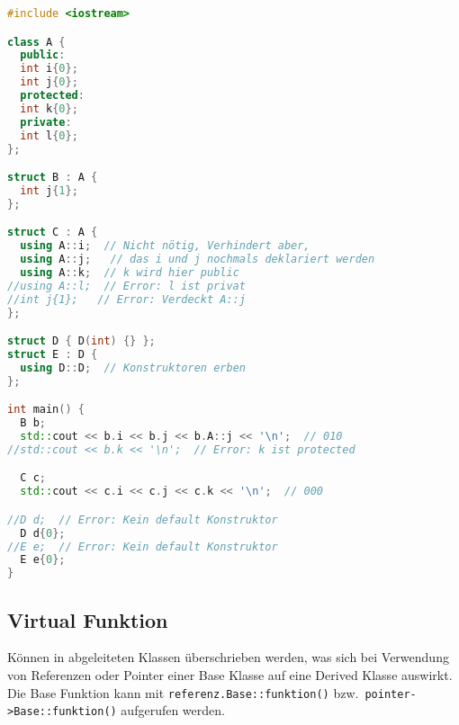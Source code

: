 \begin{lstlisting}[language=C++]
#include <iostream>

class A {
  public:
  int i{0};
  int j{0};
  protected:
  int k{0};
  private:
  int l{0};
};

struct B : A {
  int j{1};
};

struct C : A {
  using A::i;  // Nicht nötig, Verhindert aber,
  using A::j;   // das i und j nochmals deklariert werden
  using A::k;  // k wird hier public
//using A::l;  // Error: l ist privat
//int j{1};   // Error: Verdeckt A::j
};

struct D { D(int) {} };
struct E : D {
  using D::D;  // Konstruktoren erben
};

int main() {
  B b;
  std::cout << b.i << b.j << b.A::j << '\n';  // 010
//std::cout << b.k << '\n';  // Error: k ist protected

  C c;
  std::cout << c.i << c.j << c.k << '\n';  // 000

//D d;  // Error: Kein default Konstruktor
  D d{0};
//E e;  // Error: Kein default Konstruktor
  E e{0};
}
\end{lstlisting}

\subsection{Virtual Funktion}

Können in abgeleiteten Klassen überschrieben werden, was sich bei Verwendung von
Referenzen oder Pointer einer Base Klasse auf eine Derived Klasse auswirkt.
Die Base Funktion kann mit \lstinline|referenz.Base::funktion()| bzw.\
\lstinline|pointer->Base::funktion()| aufgerufen werden.

